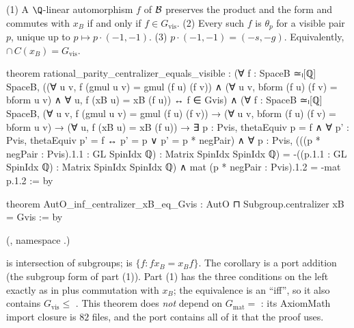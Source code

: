 \begin{theorem}\label{ch21:thm:parity}
(1) A $\Q$-linear automorphism $f$ of $\mathcal{B}$ preserves the product and the form and commutes with
$x_B$ if and only if $f\in G_{\mathrm{vis}}$.  (2) Every such $f$ is $\theta_p$ for a visible pair $p$,
unique up to $p\mapsto p\cdot(-1,-1)$.  (3) $p\cdot(-1,-1)=(-s,-g)$.  Equivalently,
 $\cap\,C(x_B)=G_{\mathrm{vis}}$.
\end{theorem}
\begin{leancode}
theorem rational_parity_centralizer_equals_visible :
    (∀ f : SpaceB ≃ₗ[ℚ] SpaceB, ((∀ u v, f (gmul u v) = gmul (f u) (f v)) ∧
        (∀ u v, bform (f u) (f v) = bform u v) ∧ ∀ u, f (xB u) = xB (f u)) ↔ f ∈ Gvis) ∧
    (∀ f : SpaceB ≃ₗ[ℚ] SpaceB, (∀ u v, f (gmul u v) = gmul (f u) (f v)) →
      (∀ u v, bform (f u) (f v) = bform u v) → (∀ u, f (xB u) = xB (f u)) →
      ∃ p : Pvis, thetaEquiv p = f ∧
        ∀ p' : Pvis, thetaEquiv p' = f ↔ p' = p ∨ p' = p * negPair) ∧
    ∀ p : Pvis, (((p * negPair : Pvis).1.1 : GL SpinIdx ℚ) : Matrix SpinIdx SpinIdx ℚ) =
        -((p.1.1 : GL SpinIdx ℚ) : Matrix SpinIdx SpinIdx ℚ) ∧
      mat (p * negPair : Pvis).1.2 = -mat p.1.2 := by
\end{leancode}
\begin{leancode}
theorem AutO_inf_centralizer_xB_eq_Gvis :
    AutO ⊓ Subgroup.centralizer {xB} = Gvis := by
\end{leancode}
(, namespace .)
\begin{dictionary}
 is intersection of subgroups;  is $\{f: fx_B=x_Bf\}$.  The
corollary is a port addition (the subgroup form of part (1)).  Part (1) has the three conditions on the
left exactly as in  plus commutation with $x_B$; the equivalence is an ``iff'', so it also
contains $G_{\mathrm{vis}}\le$ .  This theorem does \emph{not} depend on
$G_{\mathrm{mat}}=$ : its AxiomMath import closure is $82$ files, and the port contains all of
it that the proof uses.
\end{dictionary}
